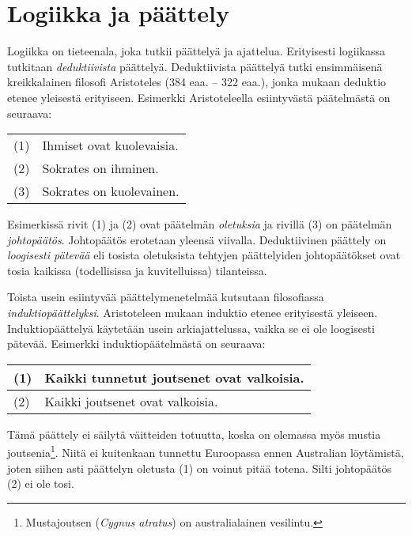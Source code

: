 \chapter{Logiikka ja päättely}%

Logiikka on tieteenala, joka tutkii päättelyä ja ajattelua. Erityisesti logiikassa tutkitaan \emph{deduktiivista} päättelyä. Deduktiivista päättelyä tutki ensimmäisenä kreikkalainen filosofi Aristoteles (384 eaa. -- 322 eaa.), jonka mukaan deduktio etenee yleisestä erityiseen. Esimerkki Aristoteleella esiintyvästä pää\-tel\-mäs\-tä on seuraava:

\bigskip

\begin{center}
\begin{tabular}{ll}
(1) & Ihmiset ovat kuolevaisia.\\ 
(2) & Sokrates on ihminen.\\ \hline
(3) & Sokrates on kuolevainen.
\end{tabular}
\end{center}

\bigskip

Esimerkissä rivit (1) ja (2) ovat päätelmän \emph{oletuksia} ja rivillä (3) on päätelmän \emph{johtopäätös}. Johtopäätös erotetaan yleensä viivalla. Deduktiivinen päättely on {\em loogisesti pätevää} eli tosista oletuksista tehtyjen päättelyiden johtopäätökset ovat tosia kaikissa (todellisissa ja kuvitelluissa) tilanteissa.

Toista usein esiintyvää päättelymenetelmää kutsutaan filosofiassa \emph{induktiopäättelyksi}. Aristoteleen mukaan induktio etenee erityisestä yleiseen.  Induktiopäättelyä käytetään usein arkiajattelussa, vaikka se ei ole loogisesti pätevää. Esimerkki induktiopäätelmästä on seuraava:

\bigskip

\begin{center}
\begin{tabular}{ll}
(1) & Kaikki tunnetut joutsenet ovat valkoisia.\\ \hline
(2) & Kaikki joutsenet ovat valkoisia.
\end{tabular}
\end{center}

\bigskip

Tämä päättely ei säilytä väitteiden totuutta, koska on olemassa myös mustia joutsenia\footnote{Mustajoutsen ({\it Cygnus atratus}) on australialainen vesilintu.}. Niitä ei kuitenkaan tunnettu Euroopassa ennen Australian löytämistä, joten siihen asti päättelyn oletusta (1) on voinut pitää totena. Silti johtopäätös (2) ei ole tosi.

